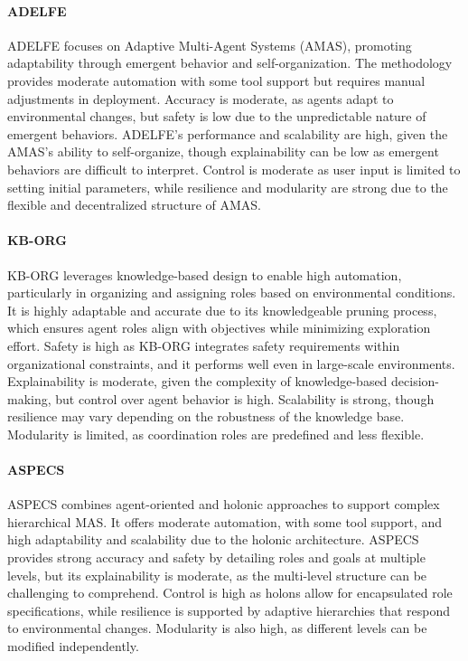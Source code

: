 \documentclass[sigconf,anonymous]{aamas}
\begin{document}
\paragraph{ADELFE}
ADELFE \cite{gleize2008adelfe} focuses on Adaptive Multi-Agent Systems (AMAS), promoting adaptability through emergent behavior and self-organization. The methodology provides moderate automation with some tool support but requires manual adjustments in deployment. Accuracy is moderate, as agents adapt to environmental changes, but safety is low due to the unpredictable nature of emergent behaviors. ADELFE's performance and scalability are high, given the AMAS's ability to self-organize, though explainability can be low as emergent behaviors are difficult to interpret. Control is moderate as user input is limited to setting initial parameters, while resilience and modularity are strong due to the flexible and decentralized structure of AMAS.

\paragraph{KB-ORG}
KB-ORG \cite{corkill2008automated} leverages knowledge-based design to enable high automation, particularly in organizing and assigning roles based on environmental conditions. It is highly adaptable and accurate due to its knowledgeable pruning process, which ensures agent roles align with objectives while minimizing exploration effort. Safety is high as KB-ORG integrates safety requirements within organizational constraints, and it performs well even in large-scale environments. Explainability is moderate, given the complexity of knowledge-based decision-making, but control over agent behavior is high. Scalability is strong, though resilience may vary depending on the robustness of the knowledge base. Modularity is limited, as coordination roles are predefined and less flexible.

\paragraph{ASPECS}
ASPECS \cite{bernon2011aspecs} combines agent-oriented and holonic approaches to support complex hierarchical MAS. It offers moderate automation, with some tool support, and high adaptability and scalability due to the holonic architecture. ASPECS provides strong accuracy and safety by detailing roles and goals at multiple levels, but its explainability is moderate, as the multi-level structure can be challenging to comprehend. Control is high as holons allow for encapsulated role specifications, while resilience is supported by adaptive hierarchies that respond to environmental changes. Modularity is also high, as different levels can be modified independently.
\end{document}
